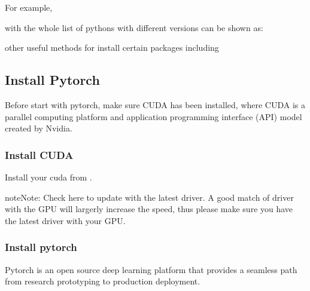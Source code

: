 \documentclass[letterpaper,10pt,english]{sphinxmanual}
\begin{document}
For example,

%
\begin{sphinxVerbatim}[commandchars=\\\{\}]
\end{sphinxVerbatim}

with the whole list of pythons with different versions can be shown as:

%
\begin{sphinxVerbatim}[commandchars=\\\{\}]
\end{sphinxVerbatim}

other useful methods for install certain packages including

%
\begin{sphinxVerbatim}[commandchars=\\\{\}]
\end{sphinxVerbatim}


\subsection{Install Pytorch}
\label{\detokenize{usage/installation:install-pytorch}}
Before start with pytorch, make sure CUDA has been installed, where
CUDA is a parallel computing platform and application programming interface (API) model created by Nvidia.


\subsubsection{Install CUDA}
\label{\detokenize{usage/installation:install-cuda}}
Install your cuda from .

\begin{sphinxadmonition}{note}{Note:}
Check here to update with the latest driver. A good match of driver with the GPU will largerly increase the speed, thus please make sure you have the latest driver with your GPU.
\end{sphinxadmonition}


\subsubsection{Install pytorch}
\label{\detokenize{usage/installation:id1}}
Pytorch is an open source deep learning platform that provides a seamless path from research prototyping to production deployment.
\end{document}
